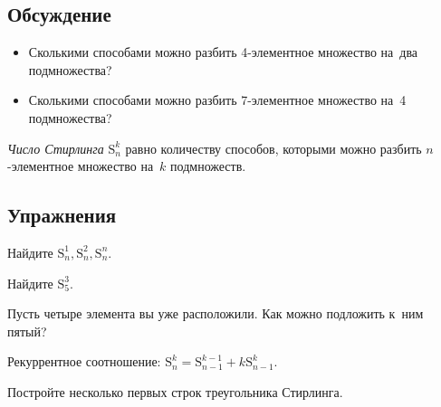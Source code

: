


\begingroup
    \def\binom#1#2{\mathrm{C}_{#1}^{#2}}%
    \def\StirlingN#1#2{\mathrm{S}_{#1}^{#2}}%
    \def\BellN#1{\mathrm{B}_{#1}}%

\subsection*{Обсуждение}

\begin{itemize}

\item
Сколькими способами можно разбить 4-эле\-мент\-ное множество на~два
подмножества?

\item
Сколькими способами можно разбить 7-эле\-мент\-ное множество на~4 подмножества?

\end{itemize}

\emph{Число Стирлинга} $\StirlingN{n}{k}$
равно количеству способов, которыми можно разбить $n$-эле\-мент\-ное множество
на~$k$ подмножеств.

\subsection*{Упражнения}

\begin{exercises}

\item
Найдите $\StirlingN{n}{1}, \StirlingN{n}{2}, \StirlingN{n}{n}$.

\item
Найдите $\StirlingN{5}{3}$.

\end{exercises}

Пусть четыре элемента вы уже расположили.
Как можно подложить к~ним пятый?
\par
Рекуррентное соотношение:
$\StirlingN{n}{k} = \StirlingN{n-1}{k-1} + k \StirlingN{n-1}{k}$.

\begin{exercises}

Постройте несколько первых строк треугольника Стирлинга.

\end{exercises}


